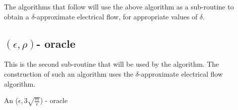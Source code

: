 \documentclass[BTech]{iitmdiss}
\begin{document}
	The algorithms that follow will use the above algorithm as a sub-routine to obtain a $\delta$-approximate electrical flow, for appropriate
	values of $\delta$.
	
	
	  
	  \subsection{$(\epsilon,\rho)$- oracle}
	    This is the second sub-routine that will be used by the algorithm. The construction of such an algorithm uses the $\delta$-approximate
	    electrical flow algorithm. \\
	    
	    \begin{algorithm}[H]
	     \caption{An ($\epsilon, 3 \sqrt{\frac{m}{\epsilon}}$) - oracle}
	    \end{algorithm}
   
\end{document}
